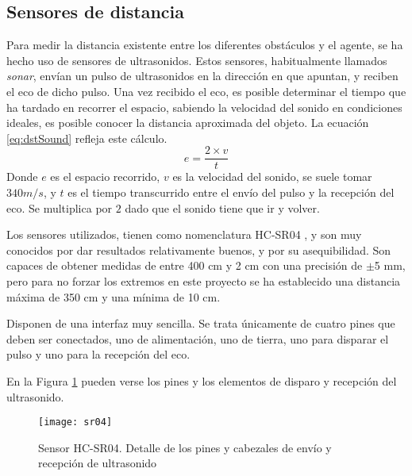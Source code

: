 \subsection{Sensores de distancia}
\label{subsec:hcsr04}
Para medir la distancia existente entre los diferentes obstáculos y el agente, se ha hecho uso de sensores de ultrasonidos. Estos sensores, habitualmente llamados \emph{sonar}, envían un pulso de ultrasonidos en la dirección en que apuntan, y reciben el eco de dicho pulso. Una vez recibido el eco, es posible determinar el tiempo que ha tardado en recorrer el espacio, sabiendo la velocidad del sonido en condiciones ideales, es posible conocer la distancia aproximada del objeto. 
La ecuación \ref{eq:dstSound} refleja este cálculo.
\begin{equation}
\label{eq:dstSound}
e = \frac{2 \times v}{t}
\end{equation}
Donde $e$ es el espacio recorrido, $v$ es la velocidad del sonido, se suele tomar $340m/s$, y $t$ es el tiempo transcurrido entre el envío del pulso y la recepción del eco. Se multiplica por $2$ dado que el sonido tiene que ir y volver.

Los sensores utilizados, tienen como nomenclatura HC-SR04 \citep{wiki:sparkHCsr04}, y son muy conocidos por dar resultados relativamente buenos, y por su asequibilidad. 
Son capaces de obtener medidas de entre 400 cm y 2 cm con una precisión de $\pm$5 mm, pero para no forzar los extremos en este proyecto se ha establecido una distancia máxima de 350 cm y una mínima de 10 cm. 

Disponen de una interfaz muy sencilla. Se trata únicamente de cuatro pines que deben ser conectados, uno de alimentación, uno de tierra, uno para disparar el pulso y uno para la recepción del eco. 

En la Figura \ref{fig:sr04} pueden verse los pines y los elementos de disparo y recepción del ultrasonido. 

\begin{figure}[H]
	\centering
	\texttt{[image: sr04]}
	\caption[Sensor HC-SR04]{Sensor HC-SR04. Detalle de los pines y cabezales de envío y recepción de ultrasonido}\label{fig:sr04}
\end{figure}

